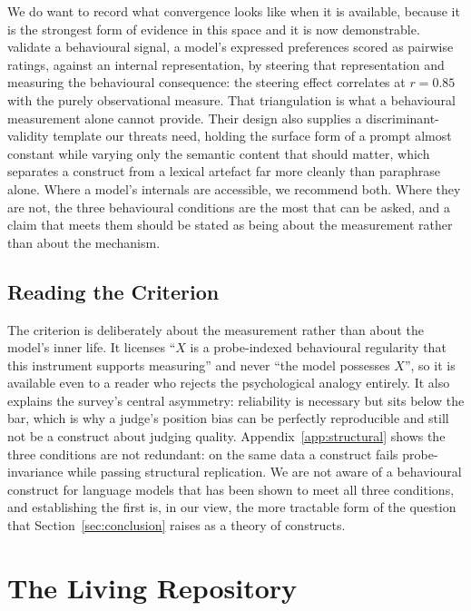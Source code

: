 \documentclass[11pt]{article}
\begin{document}
We do want to record what convergence looks like when it is available, because it
is the strongest form of evidence in this space and it is now demonstrable.
\citet{sofroniew2026emotion} validate a behavioural signal, a model's expressed
preferences scored as pairwise ratings, against an internal representation, by
steering that representation and measuring the behavioural consequence: the
steering effect correlates at $r=0.85$ with the purely observational measure.
That triangulation is what a behavioural measurement alone cannot provide. Their
design also supplies a discriminant-validity template our threats need, holding
the surface form of a prompt almost constant while varying only the semantic
content that should matter, which separates a construct from a lexical artefact
far more cleanly than paraphrase alone. Where a model's internals are
accessible, we recommend both. Where they are not, the three behavioural
conditions are the most that can be asked, and a claim that meets them should be
stated as being about the measurement rather than about the mechanism.

\subsection{Reading the Criterion}
\label{app:criterionreading}

The criterion is deliberately about the measurement rather than about the model's
inner life. It licenses ``$X$ is a probe-indexed behavioural regularity that this
instrument supports measuring'' and never ``the model possesses $X$'', so it is available
even to a reader who rejects the psychological analogy entirely. It also
explains the survey's central asymmetry: reliability is necessary but sits below
the bar, which is why a judge's position bias can be perfectly reproducible
\cite{shi2025judging} and still not be a construct about judging quality. Appendix~\ref{app:structural} shows the three conditions are not
redundant: on the same data a construct fails probe-invariance while passing
structural replication. We are not aware of a behavioural construct for
language models that has been shown to meet all three conditions, and establishing the first is, in our view, the more
tractable form of the question that Section~\ref{sec:conclusion} raises as a
theory of constructs.

\section{The Living Repository}
\label{app:repo}
\end{document}
